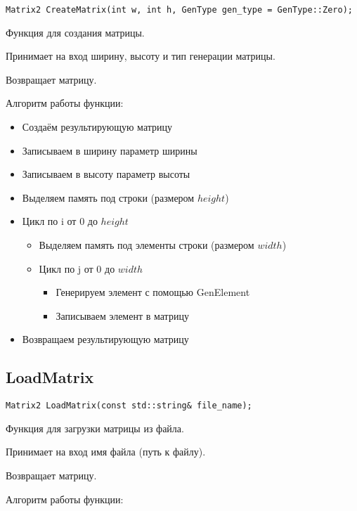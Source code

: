 \begin{lstlisting}[label={lst:CreateMatrix}]
	Matrix2 CreateMatrix(int w, int h, GenType gen_type = GenType::Zero);
\end{lstlisting}

Функция для создания матрицы.

Принимает на вход ширину, высоту и тип генерации матрицы.

Возвращает матрицу.

Алгоритм работы функции:

\begin{itemize}
	\item Создаём результирующую матрицу
	\item Записываем в ширину параметр ширины
	\item Записываем в высоту параметр высоты
	\item Выделяем память под строки (размером $ height $)
	\item Цикл по i от 0 до $ height $
	\begin{itemize}
		\item Выделяем память под элементы строки (размером $ width $)
		\item Цикл по j от 0 до $ width $
		\begin{itemize}
			  \item Генерируем элемент с помощью GenElement
			  \item Записываем элемент в матрицу
		\end{itemize}
	\end{itemize}
	\item Возвращаем результирующую матрицу
\end{itemize}

\subsection*{LoadMatrix}

\begin{lstlisting}[label={lst:LoadMatrix}]
	Matrix2 LoadMatrix(const std::string& file_name);
\end{lstlisting}

Функция для загрузки матрицы из файла.

Принимает на вход имя файла (путь к файлу).

Возвращает матрицу.

Алгоритм работы функции:

